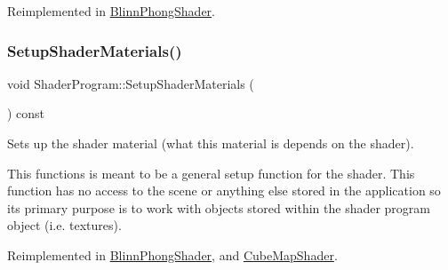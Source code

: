 Reimplemented in \hyperlink{class_blinn_phong_shader_a812ffd751068ae3bfc131ddb27712941}{Blinn\+Phong\+Shader}.

\hypertarget{class_shader_program_a20ea5669f122fa6143e7fa8ee9d92578}{}\label{class_shader_program_a20ea5669f122fa6143e7fa8ee9d92578} 
\subsubsection{\texorpdfstring{Setup\+Shader\+Materials()}{SetupShaderMaterials()}}
{\footnotesize\ttfamily void Shader\+Program\+::\+Setup\+Shader\+Materials (\begin{DoxyParamCaption}{ }\end{DoxyParamCaption}) const\hspace{0.3cm}{\ttfamily [virtual]}}



Sets up the shader material (what this material is depends on the shader). 

This functions is meant to be a general setup function for the shader. This function has no access to the scene or anything else stored in the application so its primary purpose is to work with objects stored within the shader program object (i.\+e. textures). 

Reimplemented in \hyperlink{class_blinn_phong_shader_a444db9ffe3d55dbbb55ced8cf4abb705}{Blinn\+Phong\+Shader}, and \hyperlink{class_cube_map_shader_a9deaf42646258af9237751f331fb215a}{Cube\+Map\+Shader}.

\hypertarget{class_shader_program_aac2a462281a872df0ed8d197ec0b4104}{}\label{class_shader_program_aac2a462281a872df0ed8d197ec0b4104} 
